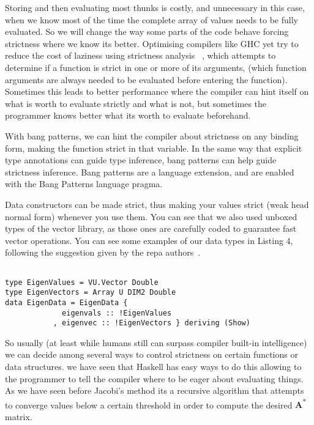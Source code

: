 \documentclass{tmr}
\begin{document}
Storing and then evaluating most thunks is costly, and unnecessary in this case, when we know 
most of the time the complete array of values needs to be fully evaluated. So we will change the
way some parts of the code behave forcing strictness where we know its better.
Optimising compilers like GHC yet try to reduce the cost of laziness using strictness analysis
 ~\cite{Strictness}, which attempts to determine if a function is strict in one or more of 
its arguments, (which function arguments are always needed to be evaluated before entering the function). 
Sometimes this leads to better performance where the compiler can hint itself on what is worth to evaluate
strictly and what is not, but sometimes the programmer knows better what its worth 
to evaluate beforehand.

With bang patterns, we can hint the compiler about strictness on any binding form, 
making the function strict in that variable. In the same way that explicit type annotations can 
guide type inference, bang patterns can help guide strictness inference. Bang patterns 
are a language extension, and are enabled with the Bang Patterns language pragma.

Data constructors can be made strict, thus making your values strict (weak head normal form)
whenever you use them.  You can see that we also used unboxed types of the vector library,
as those ones are carefully coded to guarantee fast vector operations. You can see some examples of 
our data types in Listing 4, following the suggestion given by the repa authors~\cite{bang}.

\begin{lstlisting}[float,captionpos=b,belowcaptionskip=4pt, caption= Strict data types for eigenvalue operations]

type EigenValues = VU.Vector Double
type EigenVectors = Array U DIM2 Double
data EigenData = EigenData {
             eigenvals :: !EigenValues
           , eigenvec :: !EigenVectors } deriving (Show)

\end{lstlisting}

So usually (at least while humans still can surpass compiler built-in intelligence) we can decide among several 
ways to control strictness on certain functions or data structures. we have seen that Haskell has easy ways to do
 this allowing to the programmer to tell the compiler where to be eager 
about evaluating things. As we have seen before Jacobi's method its a recursive algorithm that
 attempts to converge values below a certain threshold 
in order to compute the desired {\textbf A\textsuperscript{*}} matrix.
\end{document}
